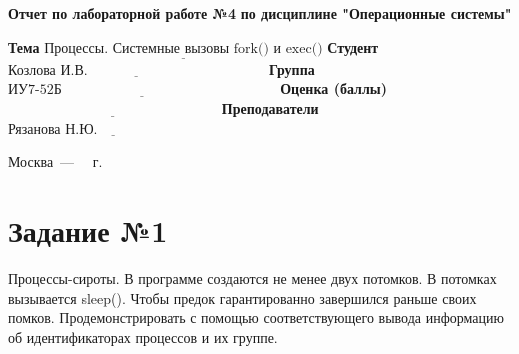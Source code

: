 \documentclass[12pt]{report}
\begin{document}
\begin{titlepage}
	
	\begin{center}
		\noindent\begin{minipage}{1.3\textwidth}\centering
			\Large\textbf{  Отчет по лабораторной работе №4}\newline
			\textbf{по дисциплине "Операционные системы"}\newline\newline
		\end{minipage}
	\end{center}
	
	\noindent\textbf{Тема} $\underline{\text{Процессы. Системные вызовы fork() и exec()}}$\newline\newline
	\noindent\textbf{Студент} $\underline{\text{Козлова И.В.~~~~~~~~~~~~~~~~~~~~~~~~~~~~~~~~~~~~~~}}$\newline\newline
	\noindent\textbf{Группа} $\underline{\text{ИУ7-52Б~~~~~~~~~~~~~~~~~~~~~~~~~~~~~~~~~~~~~~~~~~~~~~}}$\newline\newline
	\noindent\textbf{Оценка (баллы)} $\underline{\text{~~~~~~~~~~~~~~~~~~~~~~~~~~~~~~~~~~~~~~~~~~~~~}}$\newline\newline
	\noindent\textbf{Преподаватели} $\underline{\text{Рязанова Н.Ю.~~~~~~~~~~~~~~~~~~~~~~~~~~}}$\newline\newline\newline
	
	\begin{center}
		\vfill
		Москва~---~\the\year
		~г.
	\end{center}
\end{titlepage}

\newpage

\section*{Задание №1}

Процессы-сироты. В программе создаются не менее двух потомков. В потомках вызывается sleep(). Чтобы предок гарантированно завершился раньше своих помков. Продемонстрировать с помощью соответствующего вывода информацию об идентификаторах процессов и их группе.
\end{document}
